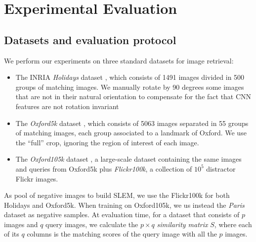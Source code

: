 \section{Experimental Evaluation}
\label{eval}


\subsection{Datasets and evaluation protocol} \label{eval:protocol}
We perform our experiments on three standard datasets for image retrieval:
\begin{itemize}
    \item The INRIA \emph{Holidays} dataset \cite{holidays}, which consists of 1491 images divided in 500 groups of matching images. We manually rotate by 90 degrees some images that are not in their natural orientation to compensate for the fact that CNN features are not rotation invariant~\cite{Arandjelovic15,babenko14,RaToCh16}
    \item The \emph{Oxford5k} dataset \cite{oxford}, which consists of 5063 images separated in 55 groups of matching images, each group associated to a landmark of Oxford. We use the ``full'' crop, ignoring the region of interest of each image.
    \item The \emph{Oxford105k} dataset \cite{oxford}, a large-scale dataset containing the same images and queries from Oxford5k plus \emph{Flickr100k}, a collection of $10^5$ distractor Flickr images.
\end{itemize}
As pool of negative images to build SLEM, we use the Flickr100k for both Holidays and Oxford5k. When training on Oxford105k, we us instead the \emph{Paris} dataset \cite{PhiChIsSiZi08} as negative samples.
At evaluation time, for a dataset that consists of $p$ images and $q$ query images, we calculate the $p\times q$ \emph{similarity matrix} $S$, where each of its $q$ columns is the matching scores of the query image with all the $p$ images. 

